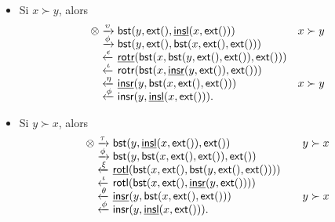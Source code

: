 \begin{itemize}

  \item Si \(x \succ y\), alors
\begin{equation*}
\begin{array}{@{}r@{\;}l@{\;}l@{\quad}r@{}}
\otimes
& \xrightarrow{\smash{\upsilon}} &
  \fun{bst}(y,\fun{ext}(),\ufun{insl}(x,\fun{ext}()))
& \IH{x \succ y}\\
& \xrightarrow{\smash{\phi}} &
  \fun{bst}(y,\fun{ext}(),\fun{bst}(x,\fun{ext}(),\fun{ext}()))\\
& \xleftarrow{\smash{\epsilon}} &
  \ufun{rotr}(\fun{bst}(x,\fun{bst}(y,\fun{ext}(),\fun{ext}()),\fun{ext}()))\\
& \xleftarrow{\smash{\iota}} &
  \fun{rotr}(\fun{bst}(x,\ufun{insr}(y,\fun{ext}()),\fun{ext}()))\\
& \xleftarrow{\smash{\eta}} &
  \ufun{insr}(y,\fun{bst}(x,\fun{ext}(),\fun{ext}()))
& \IH{x \succ y}\\
& \xleftarrow{\smash{\phi}} &
  \fun{insr}(y,\ufun{insl}(x,\fun{ext}())).
\end{array}
\end{equation*}

  \item Si \(y \succ x\), alors
\begin{equation*}
\begin{array}{@{}r@{\;}l@{\;}l@{\qquad}r@{}}
\otimes & \xrightarrow{\smash{\tau}} &
  \fun{bst}(y,\ufun{insl}(x,\fun{ext}()),\fun{ext}())
& \IH{y \succ x}\\
& \xrightarrow{\smash{\phi}} &
  \fun{bst}(y,\fun{bst}(x,\fun{ext}(),\fun{ext}()),\fun{ext}())\\
& \xleftarrow{\smash{\xi}} &
  \ufun{rotl}(\fun{bst}(x,\fun{ext}(),\fun{bst}(y,\fun{ext}(),\fun{ext}())))\\
& \xleftarrow{\smash{\iota}} &
  \fun{rotl}(\fun{bst}(x,\fun{ext}(),\ufun{insr}(y,\fun{ext}())))\\
& \xleftarrow{\smash{\theta}} &
  \ufun{insr}(y,\fun{bst}(x,\fun{ext}(),\fun{ext}()))
& \IH{y \succ x}\\
& \xleftarrow{\smash{\phi}} &
  \fun{insr}(y,\ufun{insl}(x,\fun{ext}())).
\end{array}
\end{equation*}

\end{itemize}

